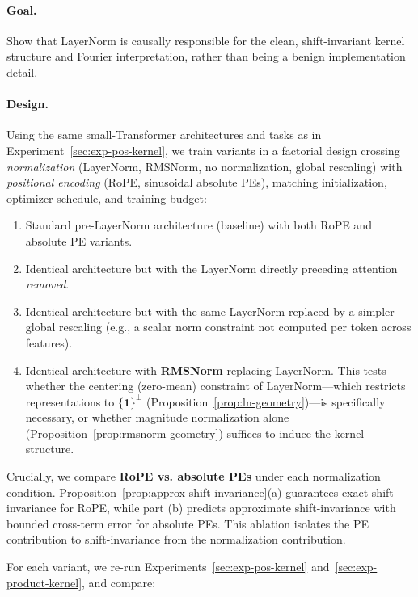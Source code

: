 \documentclass[11pt]{article}
\theoremstyle{definition}
\begin{document}
\paragraph{Goal.}
Show that LayerNorm is causally responsible for the clean, shift-invariant kernel structure and Fourier interpretation, rather than being a benign implementation detail.

\paragraph{Design.}
Using the same small-Transformer architectures and tasks as in Experiment~\ref{sec:exp-pos-kernel}, we train variants in a factorial design crossing \emph{normalization} (LayerNorm, RMSNorm, no normalization, global rescaling) with \emph{positional encoding} (RoPE, sinusoidal absolute PEs), matching initialization, optimizer schedule, and training budget:

\begin{enumerate}
    \item Standard pre-LayerNorm architecture (baseline) with both RoPE and absolute PE variants.
    \item Identical architecture but with the LayerNorm directly preceding attention \emph{removed}.
    \item Identical architecture but with the same LayerNorm replaced by a simpler global rescaling (e.g., a scalar norm constraint not computed per token across features).
    \item Identical architecture with \textbf{RMSNorm} \cite{zhang2019rmsnorm} replacing LayerNorm. This tests whether the centering (zero-mean) constraint of LayerNorm---which restricts representations to $\{\mathbf{1}\}^\perp$ (Proposition~\ref{prop:ln-geometry})---is specifically necessary, or whether magnitude normalization alone (Proposition~\ref{prop:rmsnorm-geometry}) suffices to induce the kernel structure.
\end{enumerate}

Crucially, we compare \textbf{RoPE vs. absolute PEs} under each normalization condition. Proposition~\ref{prop:approx-shift-invariance}(a) guarantees exact shift-invariance for RoPE, while part (b) predicts approximate shift-invariance with bounded cross-term error for absolute PEs. This ablation isolates the PE contribution to shift-invariance from the normalization contribution.

For each variant, we re-run Experiments~\ref{sec:exp-pos-kernel} and~\ref{sec:exp-product-kernel}, and compare:
\end{document}
